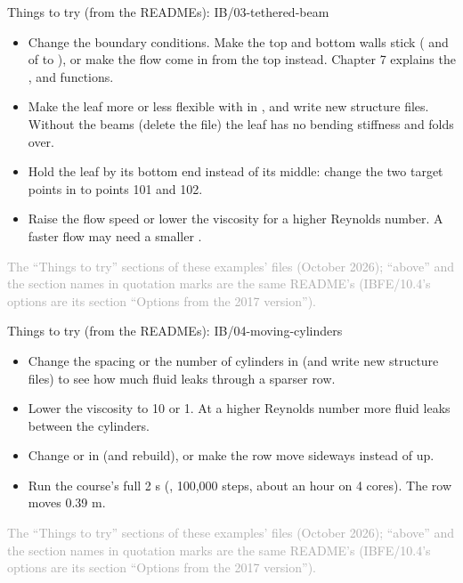 \documentclass[aspectratio=169,11pt]{beamer}
\newcommand{\sourcecredit}[1]{\vfill\begin{flushright}\tiny\textcolor{DarkGray}{#1}\end{flushright}}
\begin{document}
\begin{frame}{Things to try (from the READMEs): IB/03-tethered-beam}
\scriptsize\setlength{\leftmargini}{5em}
\begin{itemize}\setlength{\itemsep}{1pt}
  \item[IB/03.1] Change the boundary conditions. Make the top and bottom walls stick ( and  of  to ), or make the flow come in from the top instead. Chapter 7 explains the ,  and  functions.
  \item[IB/03.2] Make the leaf more or less flexible with  in , and write new structure files. Without the beams (delete the  file) the leaf has no bending stiffness and folds over.
  \item[IB/03.3] Hold the leaf by its bottom end instead of its middle: change the two target points in  to points 101 and 102.
  \item[IB/03.4] Raise the flow speed  or lower the viscosity  for a higher Reynolds number. A faster flow may need a smaller .
\end{itemize}
\sourcecredit{The ``Things to try'' sections of these examples' \code{README.md} files (October 2026); ``above'' and the section names in quotation marks are the same README's (IBFE/10.4's options are its section ``Options from the 2017 version'').}
\end{frame}

\begin{frame}{Things to try (from the READMEs): IB/04-moving-cylinders}
\scriptsize\setlength{\leftmargini}{5em}
\begin{itemize}\setlength{\itemsep}{1pt}
  \item[IB/04.1] Change the spacing or the number of cylinders in  (and write new structure files) to see how much fluid leaks through a sparser row.
  \item[IB/04.2] Lower the viscosity  to 10 or 1. At a higher Reynolds number more fluid leaks between the cylinders.
  \item[IB/04.3] Change  or  in  (and rebuild), or make the row move sideways instead of up.
  \item[IB/04.4] Run the course's full 2 s (, 100,000 steps, about an hour on 4 cores). The row moves 0.39 m.
\end{itemize}
\sourcecredit{The ``Things to try'' sections of these examples' \code{README.md} files (October 2026); ``above'' and the section names in quotation marks are the same README's (IBFE/10.4's options are its section ``Options from the 2017 version'').}
\end{frame}
\end{document}
